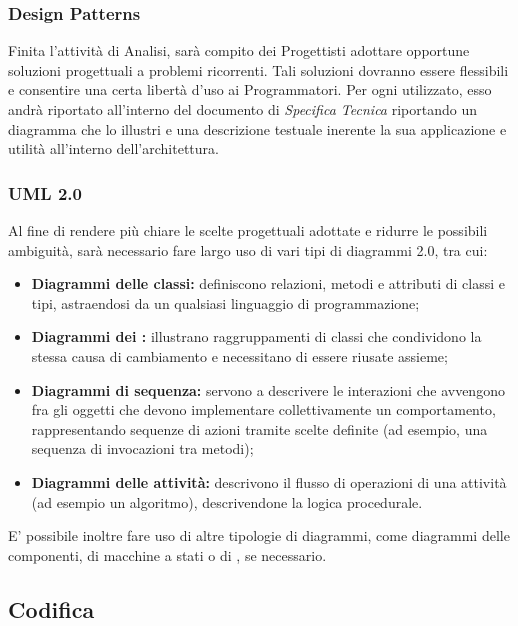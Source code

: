 \documentclass[../NomeDocumento.tex]{subfiles}
\begin{document}
	\subsubsection{Design Patterns}
	
	Finita l'attività di Analisi, sarà compito dei Progettisti adottare opportune soluzioni progettuali a problemi ricorrenti. Tali soluzioni dovranno essere 
flessibili e consentire una certa libertà d'uso ai Programmatori. Per ogni  utilizzato, esso andrà riportato all'interno del documento di \textit{Specifica Tecnica} riportando un diagramma che lo illustri e una descrizione testuale inerente la sua applicazione e utilità all'interno dell'architettura.
	
	\subsubsection{UML 2.0}
	
	Al fine di rendere più chiare le scelte progettuali adottate e ridurre le possibili ambiguità, sarà necessario fare largo uso di vari tipi di diagrammi  2.0, tra cui:
	
	\begin{itemize}
		\item \textbf{Diagrammi delle classi:} definiscono relazioni, metodi e attributi di classi e tipi, astraendosi da un qualsiasi linguaggio di programmazione;
		\item \textbf{Diagrammi dei :} illustrano raggruppamenti di classi che condividono la stessa causa di cambiamento e necessitano di essere riusate assieme;
		\item \textbf{Diagrammi di sequenza:} servono a descrivere le interazioni che avvengono fra gli oggetti che devono implementare collettivamente un comportamento, rappresentando sequenze di azioni tramite scelte definite (ad esempio, una sequenza di invocazioni tra metodi);
		\item \textbf{Diagrammi delle attività:} descrivono il flusso di operazioni di una attività (ad esempio un algoritmo), descrivendone la logica procedurale.
	\end{itemize}

	E' possibile inoltre fare uso di altre tipologie di diagrammi, come diagrammi delle componenti, di macchine a stati o di , se necessario.
	
	\subsection{Codifica}
	
\end{document}
